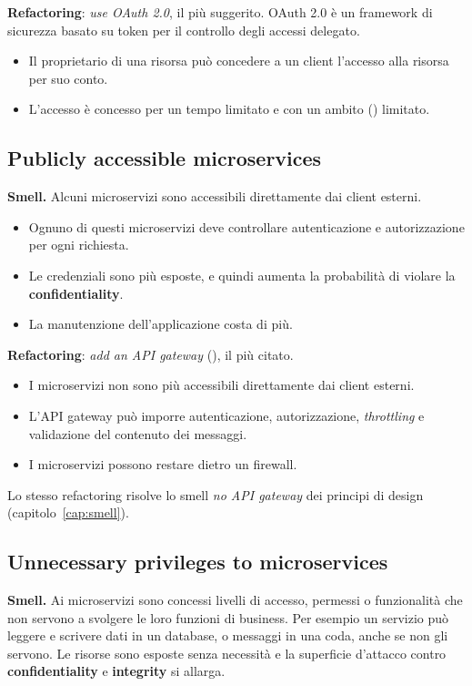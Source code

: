 \textbf{Refactoring}: \emph{use OAuth 2.0}, il più suggerito. OAuth 2.0 è un framework di sicurezza basato su token per
il controllo degli accessi delegato.
\begin{itemize}
  \item Il proprietario di una risorsa può concedere a un client l'accesso alla risorsa per suo conto.
  \item L'accesso è concesso per un tempo limitato e con un ambito () limitato.
\end{itemize}

\subsection{Publicly accessible microservices}

\textbf{Smell.} Alcuni microservizi sono accessibili direttamente dai client esterni.
\begin{itemize}
  \item Ognuno di questi microservizi deve controllare autenticazione e autorizzazione per ogni richiesta.
  \item Le credenziali sono più esposte, e quindi aumenta la probabilità di violare la \textbf{confidentiality}.
  \item La manutenzione dell'applicazione costa di più.
\end{itemize}

\textbf{Refactoring}: \emph{add an API gateway} (), il più citato.
\begin{itemize}
  \item I microservizi non sono più accessibili direttamente dai client esterni.
  \item L'API gateway può imporre autenticazione, autorizzazione, \emph{throttling} e validazione del contenuto dei
    messaggi.
  \item I microservizi possono restare dietro un firewall.
\end{itemize}
Lo stesso refactoring risolve lo smell \emph{no API gateway} dei principi di design (capitolo~\ref{cap:smell}).

\subsection{Unnecessary privileges to microservices}

\textbf{Smell.} Ai microservizi sono concessi livelli di accesso, permessi o funzionalità che non servono a svolgere le
loro funzioni di business. Per esempio un servizio può leggere e scrivere dati in un database, o messaggi in una coda,
anche se non gli servono. Le risorse sono esposte senza necessità e la superficie d'attacco contro
\textbf{confidentiality} e \textbf{integrity} si allarga.


